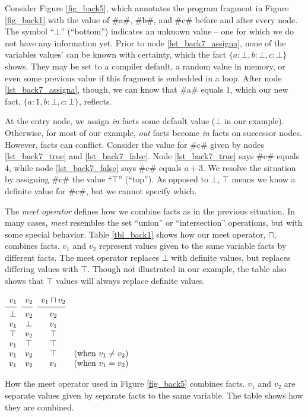 \documentclass[12pt]{report}
\begin{document}
Consider Figure \ref{fig_back5}, which annotates the program fragment
in Figure \ref{fig_back1} with the value of #a#, #b#, and #c# before
and after every node. The symbol ``$\bot$'' (``bottom'') indicates an unknown value
-- one for which we do not have any information yet. Prior to node
\ref{lst_back7_assigna}, none of the variables values' can be known
with certainty, which the fact $\{a : \bot,b : \bot,c : \bot\}$ shows.
They may be set to a compiler default, a random value in memory, or
even some previous value if this fragment is embedded in a loop. After
node \ref{lst_back7_assigna}, though, we can know that #a# equals 1,
which our new fact, $\{a : 1,b : \bot,c : \bot\}$, reflects. 

\afterpage{\clearpage{}\clearpage}

At the entry node, we assign \emph{in} facts some default value
($\bot$ in our example). Otherwise, for most of our example,
\emph{out} facts become \emph{in} facts on successor nodes. However,
facts can conflict.  Consider the value for #c# given by nodes
\ref{lst_back7_true} and \ref{lst_back7_false}. Node
\ref{lst_back7_true} says #c# equals 4, while node
\ref{lst_back7_false} says #c# equals $a + 3$. We resolve the
situation by assigning #c# the value ``$\top$'' (``top''). As opposed to $\bot$,
$\top$ means we know a definite value for #c#, but we cannot specify
which.

The \emph{meet operator} defines how we combine facts as in the
previous situation. In many cases, \emph{meet} resembles the set
``union'' or ``intersection'' operations, but with some special
behavior. Table \ref{tbl_back1} shows how our meet operator, $\sqcap$,
combines facts. $v_1$ and $v_2$ represent values given to the same
variable facts by different facts. The meet operator replaces $\bot$
with definite values, but replaces differing values with
$\top$. Though not illustrated in our example, the table also shows
that $\top$ values will always replace definite values.

\begin{table}[th]
  \centering
  \figbegin
  \begin{math}
    \begin{array}{cccc}
      v_1 & v_2 & v_1 \sqcap v_2 \\
      \cmidrule(r){1-1}\cmidrule(r){2-2}\cmidrule(r){3-3}
      \bot & v_2 & v_2 & \\ 
      v_1 & \bot & v_1 & \\
      \top & v_2 & \top & \\
      v_1 & \top & \top  &\\
      v_1 & v_2 & \top & \text{(when $v_1 \neq v_2$)}\\
      v_1 & v_2 & v_1 & \text{(when $v_1 = v_2$)}\\
    \end{array}
  \end{math}
  \caption{How the meet operator used in
    Figure \ref{fig_back5} combines facts. $v_1$ and $v_2$ are
    separate values given by separate facts to the same variable. The
    table shows how they are combined.}
  \label{tbl_lang1}
  \figend
\end{table}
\end{document}
